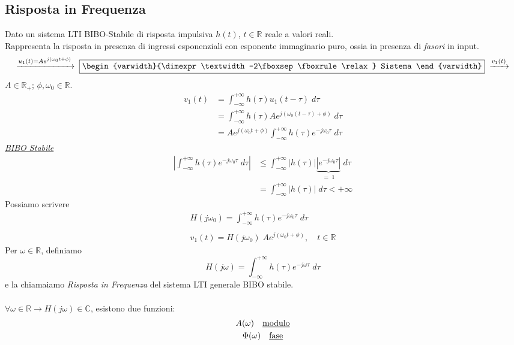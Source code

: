\documentclass{article}
\begin{document}
		\subsection{Risposta in Frequenza}
			Dato un sistema LTI BIBO-Stabile di risposta impulsiva $ h(t) $, $ t \in \mathbb{R} $ reale a valori reali.
			\\
			Rappresenta la risposta in presenza di ingressi esponenziali con esponente immaginario puro, ossia in presenza di \textit{fasori} in input.
			\[
				\xrightarrow{u_1(t) = Ae^{j(\omega_0 t + \phi)}}\; \fbox{\begin{varwidth}{\dimexpr\textwidth-2\fboxsep\fboxrule\relax} Sistema \end{varwidth}}\; \xrightarrow{v_1(t)}
			\]
			$ A \in \mathbb{R}_+ $; $ \phi, \omega_0 \in \mathbb{R} $.
			\[
				\begin{aligned}
					v_1(t) &= \int_{-\infty}^{+\infty} {h(\tau) u_1(t-\tau)\; d\tau} \\
					&= \int_{-\infty}^{+\infty} {h(\tau) Ae^{j(\omega_0(t-\tau) + \phi)}\; d\tau} \\
					&= Ae^{j(\omega_0t + \phi)} \int_{-\infty}^{+\infty} {h(\tau) e^{-j\omega_0\tau}\; d\tau}
				\end{aligned}
			\]
			\underline{\textit{BIBO Stabile}}
			\[
				\begin{aligned}
					\left| \int_{-\infty}^{+\infty} {h(\tau) e^{-j\omega_0\tau}\; d\tau} \right| &\leq \int_{-\infty}^{+\infty} {\left|h(\tau)\right| \underbrace{\left|e^{-j\omega_0\tau}\right|}_{=\; 1}\; d\tau} \\
					&= \int_{-\infty}^{+\infty} {\left|h(\tau)\right|\; d\tau} < +\infty
				\end{aligned}
			\]
			Possiamo scrivere
			\[
				\begin{aligned}
					H(j\omega_0) = \int_{-\infty}^{+\infty} {h(\tau) e^{-j\omega_0\tau}\; d\tau} \\
					\\
					v_1(t) = H(j\omega_0)\; Ae^{j(\omega_0t + \phi)},\quad t \in \mathbb{R}
				\end{aligned}
			\]
			Per $ \omega \in \mathbb{R} $, definiamo
			\[
				H(j\omega) = \int_{-\infty}^{+\infty} {h(\tau) e^{-j\omega\tau}\; d\tau}
			\]
			e la chiamaiamo \textit{Risposta in Frequenza} del sistema LTI generale BIBO stabile. \\
			\\
			$ \forall \omega \in \mathbb{R} \rightarrow H(j\omega) \in \mathbb{C}$, esistono due funzioni:
			\[
				\begin{gathered}
					A(\omega) \quad \text{\underline{modulo}} \\
					\Phi(\omega) \quad \text{\underline{fase}}
				\end{gathered}
			\]
\end{document}
